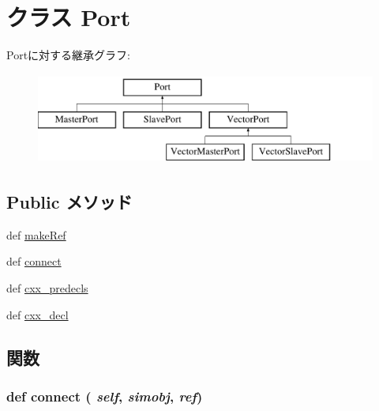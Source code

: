 \hypertarget{classm5_1_1params_1_1Port}{
\section{クラス Port}
\label{classm5_1_1params_1_1Port}
}
Portに対する継承グラフ:\begin{figure}[H]
\begin{center}
\leavevmode
\includegraphics[height=3cm]{classm5_1_1params_1_1Port}
\end{center}
\end{figure}
\subsection*{Public メソッド}
\begin{DoxyCompactItemize}
\item 
def \hyperlink{classm5_1_1params_1_1Port_a0170489846d992db3fea03df9156216b}{makeRef}
\item 
def \hyperlink{classm5_1_1params_1_1Port_a0f3e881a92d7a1b4d6d07d9e63180c98}{connect}
\item 
def \hyperlink{classm5_1_1params_1_1Port_a0b408a11a14bd1d770e28f71a6e14ab5}{cxx\_\-predecls}
\item 
def \hyperlink{classm5_1_1params_1_1Port_a723cbb1dc9ae0e7f3d102c6678f181c0}{cxx\_\-decl}
\end{DoxyCompactItemize}


\subsection{関数}
\hypertarget{classm5_1_1params_1_1Port_a0f3e881a92d7a1b4d6d07d9e63180c98}{
\subsubsection[{connect}]{\setlength{\rightskip}{0pt plus 5cm}def connect ( {\em self}, \/   {\em simobj}, \/   {\em ref})}}
\label{classm5_1_1params_1_1Port_a0f3e881a92d7a1b4d6d07d9e63180c98}



